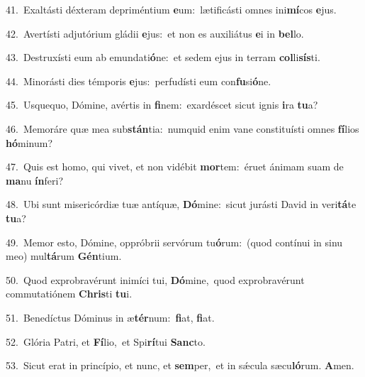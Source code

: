 {\numbfont\textcolor{\numbcolor}{41.}}~Exaltásti déxteram depriméntium \textbf{e}\-um:~\star lætificásti omnes ini\-\textbf{mí}\-cos \textbf{e}\-jus.\par
{\numbfont\textcolor{\numbcolor}{42.}}~Avertísti adjutórium gládii \textbf{e}\-jus:~\star et non es auxiliátus \textbf{e}\-i in \textbf{bel}\-lo.\par
{\numbfont\textcolor{\numbcolor}{43.}}~Destruxísti eum ab emundati\-\textbf{ó}\-ne:~\star et sedem ejus in terram \textbf{col}\-li\-\textbf{sís}\-ti.\par
{\numbfont\textcolor{\numbcolor}{44.}}~Minorásti dies témporis \textbf{e}\-jus:~\star perfudísti eum con\-\textbf{fu}\-si\-\textbf{ó}\-ne.\par
{\numbfont\textcolor{\numbcolor}{45.}}~Usquequo, Dómine, avértis in \textbf{fi}\-nem:~\star exardéscet sicut ignis \textbf{i}\-ra \textbf{tu}\-a?\par
{\numbfont\textcolor{\numbcolor}{46.}}~Memoráre quæ mea sub\-\textbf{stán}\-tia:~\star numquid enim vane constituísti omnes \textbf{fí}\-lios \textbf{hó}\-minum?\par
{\numbfont\textcolor{\numbcolor}{47.}}~Quis est homo, qui vivet, et non vidébit \textbf{mor}\-tem:~\star éruet ánimam suam de \textbf{ma}\-nu \textbf{ín}\-feri?\par
{\numbfont\textcolor{\numbcolor}{48.}}~Ubi sunt misericórdiæ tuæ antíquæ, \textbf{Dó}\-mine:~\star sicut jurásti David in veri\-\textbf{tá}\-te \textbf{tu}\-a?\par
{\numbfont\textcolor{\numbcolor}{49.}}~Memor esto, Dómine, oppróbrii servórum tu\-\textbf{ó}\-rum:~\star (quod contínui in sinu meo) mul\-\textbf{tá}\-rum \textbf{Gén}\-tium.\par
{\numbfont\textcolor{\numbcolor}{50.}}~Quod exprobravérunt inimíci tui, \textbf{Dó}\-mine,~\star quod exprobravérunt commutatiónem \textbf{Chris}\-ti \textbf{tu}\-i.\par
{\numbfont\textcolor{\numbcolor}{51.}}~Benedíctus Dóminus in æ\-\textbf{tér}\-num:~\star \textbf{fi}\-at, \textbf{fi}\-at.\par
{\numbfont\textcolor{\numbcolor}{52.}}~Glória Patri, et \textbf{Fí}\-lio,~\star et Spi\-\textbf{rí}\-tui \textbf{Sanc}\-to.\par
{\numbfont\textcolor{\numbcolor}{53.}}~Sicut erat in princípio, et nunc, et \textbf{sem}\-per,~\star et in sǽcula sæcu\-\textbf{ló}\-rum. \textbf{A}\-men.\par
